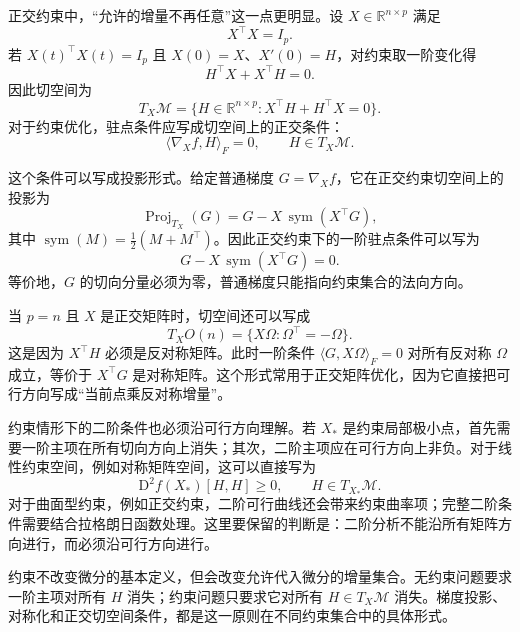 正交约束中，“允许的增量不再任意”这一点更明显。设 \(X\in\mathbb{R}^{n\times p}\) 满足
\[
X^\top X=I_p.
\]
若 \(X(t)^\top X(t)=I_p\) 且 \(X(0)=X\)、\(X'(0)=H\)，对约束取一阶变化得
\[
H^\top X+X^\top H=0.
\]
因此切空间为
\[
T_X\mathcal{M}=\{H\in\mathbb{R}^{n\times p}:X^\top H+H^\top X=0\}.
\]
对于约束优化，驻点条件应写成切空间上的正交条件：
\[
\langle \nabla_X f,H\rangle_F=0,\qquad H\in T_X\mathcal{M}.
\]

这个条件可以写成投影形式。给定普通梯度 \(G=\nabla_X f\)，它在正交约束切空间上的投影为
\[
\operatorname{Proj}_{T_X}(G)=G-X\,\operatorname{sym}(X^\top G),
\]
其中 \(\operatorname{sym}(M)=\frac12(M+M^\top)\)。因此正交约束下的一阶驻点条件可以写为
\[
G-X\,\operatorname{sym}(X^\top G)=0.
\]
等价地，\(G\) 的切向分量必须为零，普通梯度只能指向约束集合的法向方向。

当 \(p=n\) 且 \(X\) 是正交矩阵时，切空间还可以写成
\[
T_X O(n)=\{X\Omega:\Omega^\top=-\Omega\}.
\]
这是因为 \(X^\top H\) 必须是反对称矩阵。此时一阶条件 \(\langle G,X\Omega\rangle_F=0\) 对所有反对称 \(\Omega\) 成立，等价于 \(X^\top G\) 是对称矩阵。这个形式常用于正交矩阵优化，因为它直接把可行方向写成“当前点乘反对称增量”。

约束情形下的二阶条件也必须沿可行方向理解。若 \(X_\ast\) 是约束局部极小点，首先需要一阶主项在所有切向方向上消失；其次，二阶主项应在可行方向上非负。对于线性约束空间，例如对称矩阵空间，这可以直接写为
\[
\mathrm{D}^2 f(X_\ast)[H,H]\ge0,\qquad H\in T_{X_\ast}\mathcal{M}.
\]
对于曲面型约束，例如正交约束，二阶可行曲线还会带来约束曲率项；完整二阶条件需要结合拉格朗日函数处理。这里要保留的判断是：二阶分析不能沿所有矩阵方向进行，而必须沿可行方向进行。

约束不改变微分的基本定义，但会改变允许代入微分的增量集合。无约束问题要求一阶主项对所有 \(H\) 消失；约束问题只要求它对所有 \(H\in T_X\mathcal{M}\) 消失。梯度投影、对称化和正交切空间条件，都是这一原则在不同约束集合中的具体形式。
